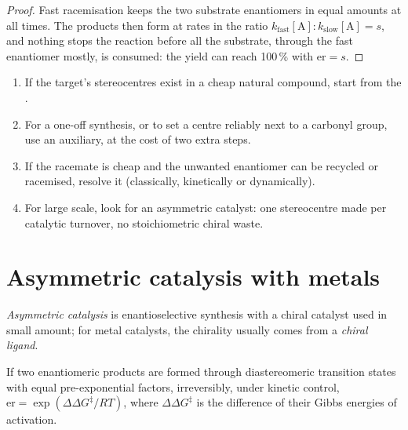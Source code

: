 \begin{proof}
Fast racemisation keeps the two substrate enantiomers in equal amounts at all
times. The products then form at rates in the ratio $k_{\mathrm{fast}}[\mathrm A] : k_{\mathrm{slow}}[\mathrm A] = s$, and nothing
stops the reaction before all the substrate, through the fast enantiomer mostly,
is consumed: the yield can reach 100\,\% with $\mathrm{er} = s$.
\end{proof}

\begin{method}\label{met:b3:asymmetric-synthesis:strategy}
\begin{enumerate}
  \item If the target's stereocentres exist in a cheap natural compound, start
        from the .
  \item For a one-off synthesis, or to set a centre reliably next to a carbonyl
        group, use an auxiliary, at the cost of two extra steps.
  \item If the racemate is cheap and the unwanted enantiomer can be recycled or
        racemised, resolve it (classically, kinetically or dynamically).
  \item For large scale, look for an asymmetric catalyst: one stereocentre made
        per catalytic turnover, no stoichiometric chiral waste.
\end{enumerate}
\end{method}

\section{Asymmetric catalysis with metals}

\begin{definition}\label{def:b3:asymmetric-synthesis:asymmetric-catalysis}
\emph{Asymmetric catalysis} is enantioselective
synthesis with a chiral catalyst used in small amount; for metal catalysts, the
chirality usually comes from a \emph{chiral ligand}.
\end{definition}

\begin{theorem}\label{thm:b3:asymmetric-synthesis:er-ddg}
If two enantiomeric products are formed through diastereomeric transition states
with equal pre-exponential factors, irreversibly, under kinetic control,
$\mathrm{er} = \exp(\Delta\Delta G^\ddagger/RT)$, where $\Delta\Delta G^\ddagger$ is the difference of their Gibbs energies of
activation.
\end{theorem}

